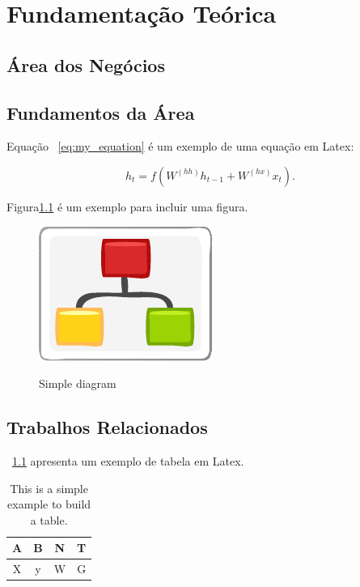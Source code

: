 
\chapter{Fundamentação Teórica}\label{chap:background}


\section{Área dos Negócios}\label{sec:business}


\section{Fundamentos da Área}\label{sec:fundamental}

Equação ~\ref{eq:my_equation} é um exemplo de uma equação em Latex:


\begin{equation}\label{eq:my_equation}
    h_t = f(W^{(hh)}h_{t-1} + W^{(hx)}x_t).
\end{equation}


Figura\ref{fig:diagram} é um exemplo para incluir uma figura.

\begin{figure}[htb]
    \caption{Simple diagram}
    \centering
    \includegraphics[scale=1.9]{img/diagram.pdf}
    \label{fig:diagram}
\end{figure}

\cite{GRIEBLER:IJPP:18}


\cite{MACCOOL:structured_patterns:book:12}


\section{Trabalhos Relacionados}\label{sec:rw}


\tablename~\ref{tab:my_table} apresenta um exemplo de tabela em Latex.

\begin{table}[htb]
    \caption{This is a simple example to build a table.}
    \label{tab:my_table}
    \centering
    \begin{tabular}{|c|c|c|c|}
        \hline
         A & B & N & T\\ 
         \hline
         X & y & W & G\\
         \hline
    \end{tabular}
    
\end{table}